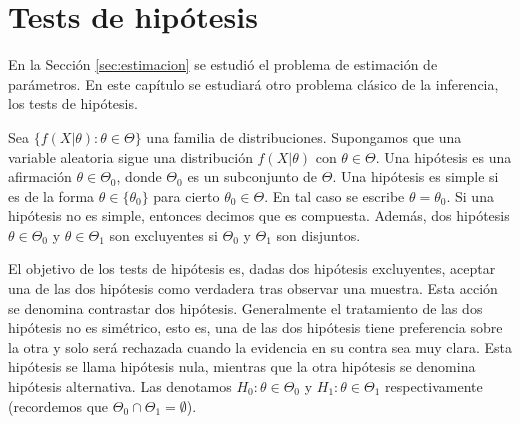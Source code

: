 

\section{Tests de hipótesis}

    En la Sección \ref{sec:estimacion} se estudió el problema de estimación de parámetros. En este capítulo se estudiará otro problema clásico de la inferencia, los tests de hipótesis.

    \begin{definition}
        Sea $\{f(X|\theta): \theta \in \Theta\}$ una familia de distribuciones. Supongamos que una variable aleatoria sigue una distribución $f(X|\theta)$ con $\theta \in \Theta$. Una hipótesis es una afirmación $\theta \in \Theta_0$, donde $\Theta_0$ es un subconjunto de $\Theta$. Una hipótesis es simple si es de la forma  $\theta \in \{\theta_0\}$ para cierto $\theta_0 \in \Theta$. En tal caso se escribe $\theta = \theta_0$. Si una hipótesis no es simple, entonces decimos que es compuesta. Además, dos hipótesis $\theta \in \Theta_0$ y $\theta \in \Theta_1$ son excluyentes si $\Theta_0$ y $\Theta_1$ son disjuntos.
    \end{definition}

    El objetivo de los tests de hipótesis es, dadas dos hipótesis excluyentes, aceptar una de las dos hipótesis como verdadera tras observar una muestra. Esta acción se denomina contrastar dos hipótesis. Generalmente el tratamiento de las dos hipótesis no es simétrico, esto es, una de las dos hipótesis tiene preferencia sobre la otra y solo será rechazada cuando la evidencia en su contra sea muy clara. Esta hipótesis se llama hipótesis nula, mientras que la otra hipótesis se denomina hipótesis alternativa. Las denotamos $H_0: \theta \in \Theta_0$ y $H_1: \theta \in \Theta_1$ respectivamente (recordemos que $\Theta_0 \cap \Theta_1 = \emptyset$).

